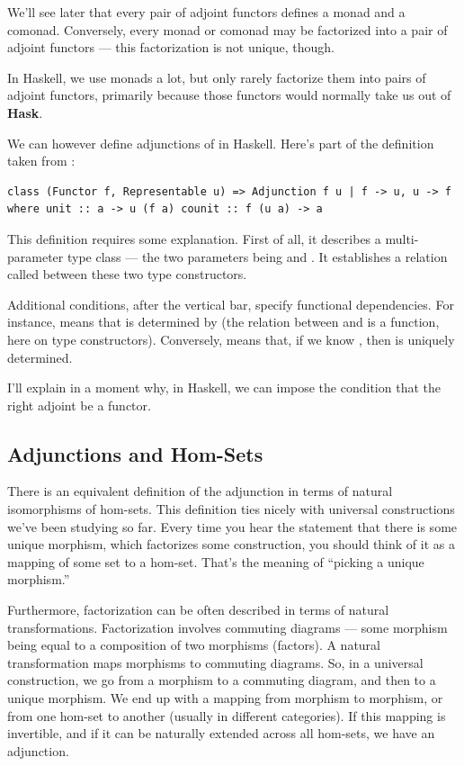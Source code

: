 We'll see later that every pair of adjoint functors defines a monad and
a comonad. Conversely, every monad or comonad may be factorized into a
pair of adjoint functors --- this factorization is not unique, though.

In Haskell, we use monads a lot, but only rarely factorize them into
pairs of adjoint functors, primarily because those functors would
normally take us out of \textbf{Hask}.

We can however define adjunctions of  in Haskell.
Here's part of the definition taken from
:

\begin{verbatim}
class (Functor f, Representable u) => Adjunction f u | f -> u, u -> f where unit :: a -> u (f a) counit :: f (u a) -> a 
\end{verbatim}

This definition requires some explanation. First of all, it describes a
multi-parameter type class --- the two parameters being  and
. It establishes a relation called  between
these two type constructors.

Additional conditions, after the vertical bar, specify functional
dependencies. For instance,  means that
 is determined by  (the relation between 
and  is a function, here on type constructors). Conversely,
 means that, if we know , then
 is uniquely determined.

I'll explain in a moment why, in Haskell, we can impose the condition
that the right adjoint  be a  functor.

\subsection{Adjunctions and Hom-Sets}\label{adjunctions-and-hom-sets}

There is an equivalent definition of the adjunction in terms of natural
isomorphisms of hom-sets. This definition ties nicely with universal
constructions we've been studying so far. Every time you hear the
statement that there is some unique morphism, which factorizes some
construction, you should think of it as a mapping of some set to a
hom-set. That's the meaning of ``picking a unique morphism.''

Furthermore, factorization can be often described in terms of natural
transformations. Factorization involves commuting diagrams --- some
morphism being equal to a composition of two morphisms (factors). A
natural transformation maps morphisms to commuting diagrams. So, in a
universal construction, we go from a morphism to a commuting diagram,
and then to a unique morphism. We end up with a mapping from morphism to
morphism, or from one hom-set to another (usually in different
categories). If this mapping is invertible, and if it can be naturally
extended across all hom-sets, we have an adjunction.

